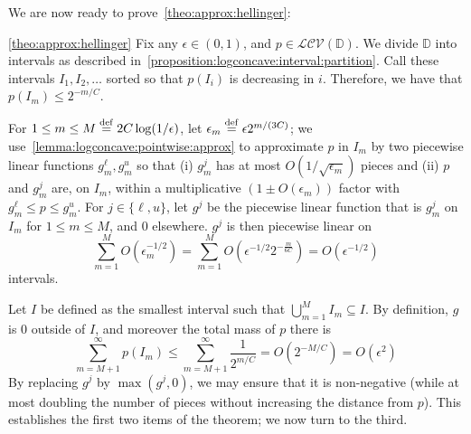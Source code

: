 \documentclass[11pt]{article}
\theoremstyle{definition}
\newcommand{\eps}{\epsilon}
\newcommand{\eqdef}{\stackrel{{\mathrm {\footnotesize def}}}{=}}
\newcommand{\bigO}[1]{{O\left( #1 \right)}}
\newcommand{\classlogconcave}{\ensuremath{\mathcal{LCV}}\xspace}
\begin{document}
\noindent We are now ready to prove~\cref{theo:approx:hellinger}:
\begin{proofof}{\cref{theo:approx:hellinger}}
Fix any $\eps\in(0,1)$, and $p\in\classlogconcave(\mathbb{D})$. We divide $\mathbb{D}$ into intervals as described in~\cref{proposition:logconcave:interval:partition}. Call these intervals $I_1,I_2,\ldots$ sorted so that $p(I_i)$ is decreasing in $i$. Therefore, we have that $p(I_m) \leq 2^{-m/C}$.

For $1 \leq m \leq M\eqdef 2C\log(1/\eps)$, let $\eps_m\eqdef \eps 2^{m/(3C)}$; we use~\cref{lemma:logconcave:pointwise:approx} to approximate $p$ in $I_m$ by two piecewise linear functions $g^{\ell}_m, g^u_m$ so that (i) $g^j_m$ has at most $O(1/\sqrt{\eps_m})$ pieces and (ii) $p$ and $g^j_m$ are, on $I_m$, within a multiplicative $(1\pm O(\eps_m))$ factor with $g^{\ell}_m \leq p\leq g^u_m$. For $j\in\{\ell,u\}$, let $g^j$ be the piecewise linear function that is $g^j_m$ on $I_m$ for $1\leq m\leq M$, and $0$ elsewhere. $g^j$ is then piecewise linear on
\[
\sum_{m=1}^{M} O(\eps_m^{-1/2}) = \sum_{m=1}^{M} \bigO{ \eps^{-1/2} 2^{-\frac{m}{6C}} } = O(\eps^{-1/2})
\]
intervals.

Let $I$ be defined as the smallest interval such that $\bigcup_{m=1}^M I_m\subseteq I$. By definition, $g$ is $0$ outside of $I$, and moreover the total mass of $p$ there is
\[
  \sum_{m=M+1}^\infty p(I_m) \leq \sum_{m=M+1}^\infty \frac{1}{2^{m/C}} = \bigO{2^{-M/C}} = \bigO{\eps^2}
\]
By replacing $g^j$ by $\max(g^j,0)$, we may ensure that it is non-negative (while at most doubling the number of pieces without increasing the distance from $p$). This establishes the first two items of the theorem; we now turn to the third.


\end{proofof}
\end{document}
